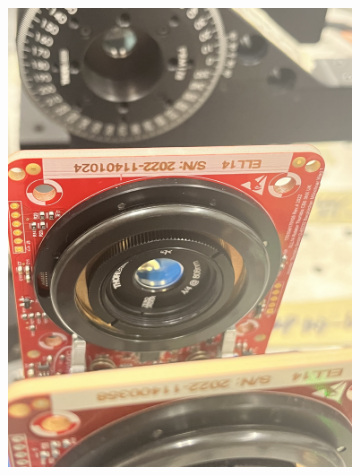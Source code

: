 \documentclass{paper}[11pt]
\begin{document}
\begin{figure}
\begin{subfigure}{0.45\linewidth}
        \includegraphics[width=1\linewidth, angle = -90]{figs/bcqwp_zero.jpg}
        \caption{}
        \label{fig:bcqwp_zero}
    \end{subfigure}
    \begin{subfigure}{0.45\linewidth}
        \centering

\end{subfigure}
\end{figure}
\end{document}
